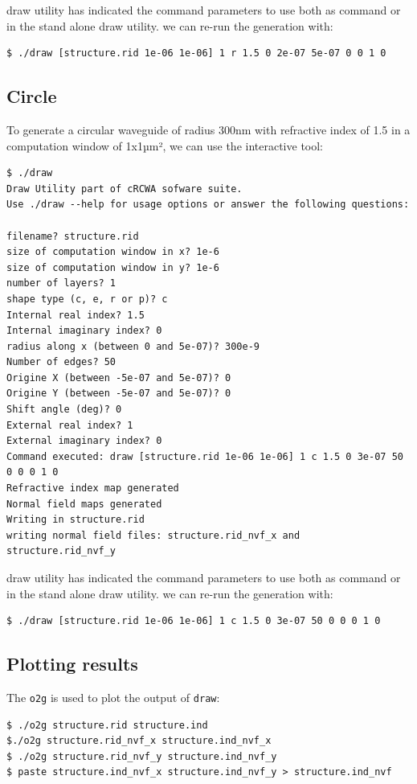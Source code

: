 \textsf{draw} utility has indicated the command parameters to use both as \afmm  command or in the stand alone \textsf{draw} utility. we can re-run the generation with:
\begin{lstlisting}
$ ./draw [structure.rid 1e-06 1e-06] 1 r 1.5 0 2e-07 5e-07 0 0 1 0 
\end{lstlisting}

\subsection{Circle}
To generate a circular waveguide of radius 300nm with refractive index of 1.5 in a computation window of 1x1µm², we can use the interactive tool:

\begin{lstlisting}
$ ./draw 
Draw Utility part of cRCWA sofware suite. 
Use ./draw --help for usage options or answer the following questions:
 
filename? structure.rid
size of computation window in x? 1e-6 
size of computation window in y? 1e-6
number of layers? 1
shape type (c, e, r or p)? c
Internal real index? 1.5
Internal imaginary index? 0
radius along x (between 0 and 5e-07)? 300e-9
Number of edges? 50
Origine X (between -5e-07 and 5e-07)? 0
Origine Y (between -5e-07 and 5e-07)? 0
Shift angle (deg)? 0
External real index? 1
External imaginary index? 0
Command executed: draw [structure.rid 1e-06 1e-06] 1 c 1.5 0 3e-07 50 0 0 0 1 0 
Refractive index map generated
Normal field maps generated
Writing in structure.rid
writing normal field files: structure.rid_nvf_x and structure.rid_nvf_y

\end{lstlisting}

\textsf{draw} utility has indicated the command parameters to use both as \afmm  command or in the stand alone \textsf{draw} utility. we can re-run the generation with:
\begin{lstlisting}
$ ./draw [structure.rid 1e-06 1e-06] 1 c 1.5 0 3e-07 50 0 0 0 1 0
\end{lstlisting}

\subsection{Plotting results}
The \texttt{o2g} is used to plot the output of \texttt{draw}:

\begin{lstlisting}
$ ./o2g structure.rid structure.ind
$./o2g structure.rid_nvf_x structure.ind_nvf_x
$ ./o2g structure.rid_nvf_y structure.ind_nvf_y
$ paste structure.ind_nvf_x structure.ind_nvf_y > structure.ind_nvf
\end{lstlisting}

